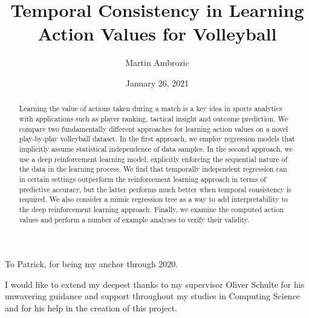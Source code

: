 \documentclass{sfuthesis}
\title{Temporal Consistency in Learning Action Values for Volleyball}
\author{Martin Ambrozic}
\date{January 26, 2021}
\begin{document}
	
	\frontmatter
	\maketitle{}
	\makecommittee{}
	
	\begin{abstract}
		Learning the value of actions taken during a match is a key idea in sports analytics with applications such as player ranking, tactical insight and outcome prediction. We compare two fundamentally different approaches for learning action values on a novel play-by-play volleyball dataset. In the first approach, we employ regression models that implicitly assume statistical independence of data samples. In the second approach, we use a deep reinforcement learning model, explicitly enforcing the sequential nature of the data in the learning process. We find that temporally independent regression can in certain settings outperform the reinforcement learning approach in terms of predictive accuracy, but the latter performs much better when temporal consistency is required. We also consider a mimic regression tree as a way to add interpretability to the deep reinforcement learning approach. Finally, we examine the computed action values and perform a number of example analyses to verify their validity.
	\end{abstract}
	
	
	\begin{dedication}
		To Patrick, for being my anchor through 2020.
	\end{dedication}
	
	
	\begin{acknowledgements}
		I would like to extend my deepest thanks to my supervisor Oliver Schulte for his unwavering guidance and support throughout my studies in Computing Science and for his help in the creation of this project.
	\end{acknowledgements}
	
	\tableofcontents%
	\clearpage
	
	\listoftables%
	\clearpage
	
	\listoffigures%
	\clearpage
	
	
	
	
	
	
\end{document}
